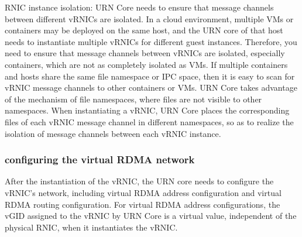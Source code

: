 RNIC instance isolation: URN Core needs to ensure that message channels between different vRNICs are isolated. In a cloud environment, multiple VMs or containers may be deployed on the same host, and the URN core of that host needs to instantiate multiple vRNICs for different guest instances. Therefore, you need to ensure that message channels between vRNICs are isolated, especially containers, which are not as completely isolated as VMs. If multiple containers and hosts share the same file namespace or IPC space, then it is easy to scan for vRNIC message channels to other containers or VMs. URN Core takes advantage of the mechanism of file namespaces, where files are not visible to other namespaces. When instantiating a vRNIC, URN Core places the corresponding files of each vRNIC message channel in different namespaces, so as to realize the isolation of message channels between each vRNIC instance.

\subsubsection{configuring the virtual RDMA network}

After the instantiation of the vRNIC, the URN core needs to configure the vRNIC's network, including virtual RDMA address configuration and virtual RDMA routing configuration.
For virtual RDMA address configurations, the vGID assigned to the vRNIC by URN Core is a virtual value, independent of the physical RNIC, when it instantiates the vRNIC.


